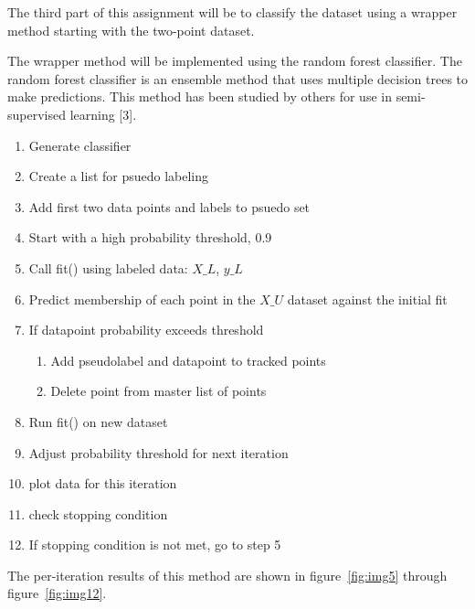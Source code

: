 
The third part of this assignment will be to classify the dataset using a wrapper method starting with the two-point dataset.

The wrapper method will be implemented using the random forest classifier. The random forest classifier is an ensemble method that uses multiple decision trees to make predictions. This method has been studied by others for use in semi-supervised learning [3].\par

\begin{tcolorbox}[breakable, title={Pseudocode for Wrapper Method for Semi-Supervised Learning}]
    \footnotesize     
    \begin{enumerate}
        \item Generate classifier
        \item Create a list for psuedo labeling
        \item Add first two data points and labels to psuedo set
        \item Start with a high probability threshold, 0.9
        \item Call fit() using labeled data: $X\_L$, $y\_L$
        \item Predict membership of each point in the $X\_U$ dataset against the initial fit
        \item If datapoint probability exceeds threshold
        \begin{enumerate}
            \item Add pseudolabel and datapoint to tracked points
            \item Delete point from master list of points
        \end{enumerate}
        \item Run fit() on new dataset
        \item Adjust probability threshold for next iteration
        \item plot data for this iteration
        \item check stopping condition
        \item If stopping condition is not met, go to step 5
    \end{enumerate}
\end{tcolorbox}
\normalsize

The per-iteration results of this method are shown in figure~\ref{fig:img5} through figure~\ref{fig:img12}. 